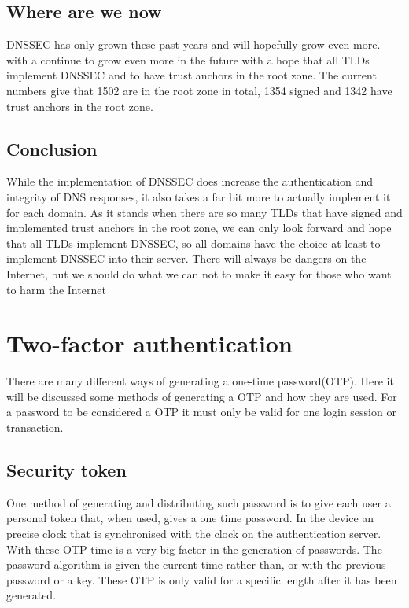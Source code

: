 \documentclass{article}
\begin{document}
        \subsection{Where are we now}
		DNSSEC has only grown these past years and will hopefully grow even more. with a continue to grow even more in the future with a hope that all TLDs implement DNSSEC and to have trust anchors in the root zone. The current numbers give that 1502 are in the root zone in total, 1354 signed and 1342 have trust anchors in the root zone.\cite{icannStats}
		\subsection{Conclusion}
		While the implementation of DNSSEC does increase the authentication and integrity of DNS responses, it also takes a far bit more to actually implement it for each domain. As it stands when there are so many TLDs that have signed and implemented trust anchors in the root zone, we can only look forward and hope that all TLDs implement DNSSEC, so all domains have the choice at least to implement DNSSEC into their server.
	    There will always be dangers on the Internet, but we should do what we can not to make it easy for those who want to harm the Internet
	\section{Two-factor authentication}
	There are many different ways of generating a one-time password(OTP). Here it will be discussed some methods of generating a OTP and how they are used. For a password to be considered a OTP it must only be valid for one login session or transaction. 
		\subsection{Security token}
        One method of generating and distributing such password is to give each user a personal token that, when used, gives a one time password. In the device an precise clock that is synchronised with the clock on the authentication server. With these OTP time is a very big factor in the generation of passwords. The password algorithm is given the current time rather than, or with the previous password or a key. These OTP is only valid for a specific length after it has been generated.
        
			
		
        
    \clearpage
	\nocite{*}
	
	
\end{document}
